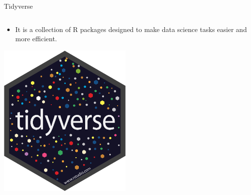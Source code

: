 \documentclass[
  ignorenonframetext,
  aspectratio=169,
]{beamer}
\providecommand{\tightlist}{%
  \setlength{\itemsep}{0pt}\setlength{\parskip}{0pt}}\usepackage{longtable,booktabs,array}
\begin{document}
\begin{frame}{Tidyverse}
\label{tidyverse}
\begin{columns}[T]
\begin{column}{0.4\textwidth}
\begin{itemize}
\tightlist
\item
  It is a collection of R packages designed to make data science tasks
  easier and more efficient.
\end{itemize}

\begin{center}
\includegraphics[width=0.5\textwidth,height=\textheight]{Intro_R_files/mediabag/tidyverse.png}
\end{center}
\end{column}


\end{columns}
\end{frame}
\end{document}
